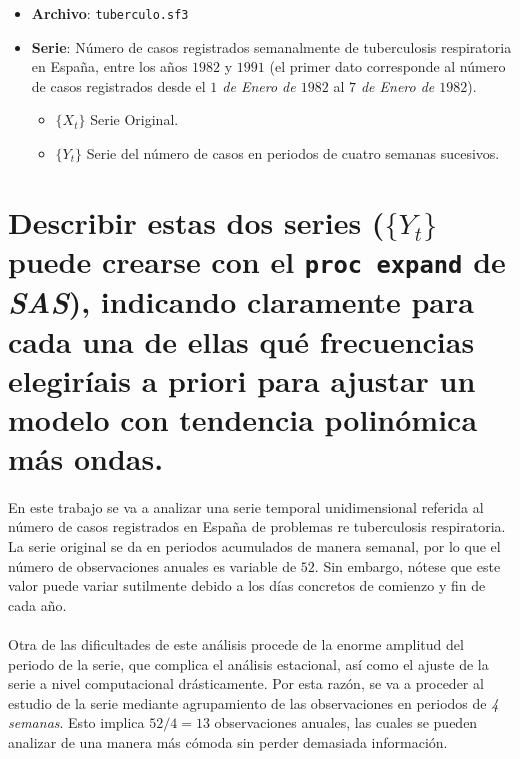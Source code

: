 \documentclass[a4paper, spanish]{article}
\begin{document}
  \maketitle

  \begin{itemize}
    \item \textbf{Archivo}: \texttt{tuberculo.sf3}
    \item \textbf{Serie}: Número de casos registrados semanalmente de tuberculosis respiratoria en España, entre los años $1982$ y $1991$ (el primer dato corresponde al número de casos registrados desde el \emph{$1$ de Enero de $1982$} al \emph{$7$ de Enero de $1982$}).
    \begin{itemize}
      \item $\{X_t\}$ Serie Original.
      \item $\{Y_t\}$ Serie del número de casos en periodos de cuatro semanas sucesivos.
    \end{itemize}
  \end{itemize}

  \section{Describir estas dos series ($\{Y_t\}$ puede crearse con el \texttt{proc expand} de \emph{SAS}), indicando claramente para cada una de ellas qué frecuencias elegiríais a priori para ajustar un modelo con tendencia polinómica más ondas.}
  \label{sec:a}

    \paragraph{}
    En este trabajo se va a analizar una serie temporal unidimensional referida al número de casos registrados en España de problemas re tuberculosis respiratoria. La serie original se da en periodos acumulados de manera semanal, por lo que el número de observaciones anuales es variable de $52$. Sin embargo, nótese que este valor puede variar sutilmente debido a los días concretos de comienzo y fin de cada año.

    \paragraph{}
    Otra de las dificultades de este análisis procede de la enorme amplitud del periodo de la serie, que complica el análisis estacional, así como el ajuste de la serie a nivel computacional drásticamente. Por esta razón, se va a proceder al estudio de la serie mediante agrupamiento de las observaciones en periodos de \emph{4 semanas}. Esto implica $52 / 4 = 13$ observaciones anuales, las cuales se pueden analizar de una manera más cómoda sin perder demasiada información.
\end{document}
